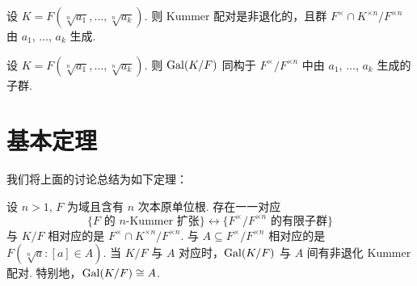 \begin{thm}
  设 $K = F(\sqrt[n]{a_1}, \ldots, \sqrt[n]{a_k})$.  则 Kummer 配对是非退化的，且群 $F^\times \cap K^{\times n} / F^{\times n}$ 由 $a_1$, $\ldots$, $a_k$ 生成.
\end{thm}
\begin{cor}
  设 $K = F(\sqrt[n]{a_1}, \ldots, \sqrt[n]{a_k})$.  则 $\operatorname{Gal}(K/F)$ 同构于 $F^\times / F^{\times n}$ 中由 $a_1$, $\ldots$, $a_k$ 生成的子群.
\end{cor}

\section{基本定理}
我们将上面的讨论总结为如下定理：
\begin{thm}
  设 $n > 1$, $F$ 为域且含有 $n$ 次本原单位根.  存在一一对应
  \[ \{ F \text{ 的\ } n \text{-Kummer 扩张} \} \leftrightarrow \{F^\times / F^{\times n} \text{ 的有限子群}\} \]
  与 $K/F$ 相对应的是 $F^\times \cap K^{\times n} / F^{\times n}$.  与 $A \subseteq F^\times / F^{\times n}$ 相对应的是 $F(\sqrt[n]{a} \colon [a] \in A)$.  当 $K/F$ 与 $A$ 对应时，$\operatorname{Gal}(K/F)$ 与 $A$ 间有非退化 Kummer 配对.  特别地，$\operatorname{Gal}(K/F) \cong A$.
\end{thm}
